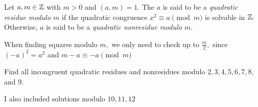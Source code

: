 \documentclass[letterpaper, 11 pt]{ximera}
\begin{document}
\begin{definition}\label{defn:quad-residue}
    Let $a,m\in\mathbb Z$ with $m>0$ and $(a,m)=1.$ The $a$ is said to be a \emph{quadratic residue modulo $m$} if the quadratic congruence $x^2\equiv a\pmod{m}$ is solvable in $\mathbb Z.$ Otherwise, $a$ is said to be a \emph{quadratic nonresidue modulo $m$}.
\end{definition}

\begin{remark}
    When finding squares modulo $m,$ we only need to check up to $\frac{m}{2},$ since $(-a)^2=a^2$ and $m-a\equiv -a\pmod{m}$
\end{remark}

\begin{br}
    Find all incongruent quadratic residues and nonresidues modulo $2,3,4,5,6,7,8,$ and $9$.


    \begin{solution}
        I also included solutions modulo $10,11,12$


\end{solution}
\end{br}
\end{document}
